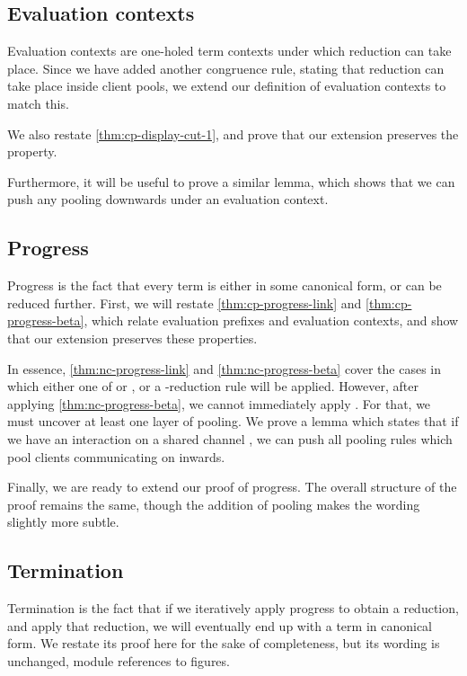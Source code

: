 \subsection{Evaluation contexts}
Evaluation contexts are one-holed term contexts under which reduction can take
place. Since we have added another congruence rule, stating that reduction can
take place inside client pools, we extend our definition of evaluation contexts
to match this.

We also restate \cref{thm:cp-display-cut-1}, and prove that our extension
preserves the property.

Furthermore, it will be useful to prove a similar lemma, which shows that we can
push any pooling downwards under an evaluation context.


\subsection{Progress}
Progress is the fact that every term is either in some canonical form, or can be
reduced further.
First, we will restate \cref{thm:cp-progress-link} and \cref{thm:cp-progress-beta},
which relate evaluation prefixes and evaluation contexts, and show that our
extension preserves these properties. 


In essence, \cref{thm:nc-progress-link} and \cref{thm:nc-progress-beta} cover
the cases in which either one of  or , or a
\textbeta-reduction rule will be applied.
However, after applying \cref{thm:nc-progress-beta}, we cannot immediately apply
. For that, we must uncover at least one layer of pooling.
We prove a lemma which states that if we have an interaction on a shared channel
, we can push all pooling rules which pool clients communicating on 
inwards. 

Finally, we are ready to extend our proof of progress. The overall structure of
the proof remains the same, though the addition of pooling makes the wording
slightly more subtle.


\subsection{Termination}
Termination is the fact that if we iteratively apply progress to obtain a
reduction, and apply that reduction, we will eventually end up with a term in
canonical form.
We restate its proof here for the sake of completeness, but its wording is
unchanged, module references to figures.



